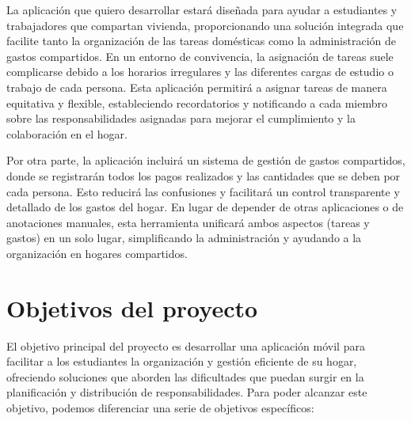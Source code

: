 La aplicación que quiero desarrollar estará diseñada para ayudar a estudiantes y trabajadores que compartan vivienda,
proporcionando una solución integrada que facilite tanto la organización de las tareas domésticas como la administración de gastos compartidos.
En un entorno de convivencia, la asignación de tareas suele complicarse debido a los horarios irregulares y las diferentes cargas de estudio o trabajo de cada persona.
Esta aplicación permitirá a asignar tareas de manera equitativa y flexible, estableciendo recordatorios y notificando a cada miembro sobre las responsabilidades
asignadas para mejorar el cumplimiento y la colaboración en el hogar. 

Por otra parte, la aplicación incluirá un sistema de gestión de gastos compartidos, donde se registrarán todos los pagos realizados
y las cantidades que se deben por cada persona. Esto reducirá las confusiones y facilitará un control transparente y detallado de los 
gastos del hogar. En lugar de depender de otras aplicaciones o de anotaciones manuales, esta herramienta unificará ambos aspectos (tareas y gastos) 
en un solo lugar, simplificando la administración y ayudando a la organización en hogares compartidos. 

\section{Objetivos del proyecto}
\label{sec:objetivos}

El objetivo principal del proyecto es desarrollar una aplicación móvil para facilitar a los estudiantes la organización y gestión eficiente de su hogar, ofreciendo soluciones que aborden las dificultades 
que puedan surgir en la planificación y distribución de responsabilidades. Para poder alcanzar este objetivo, podemos diferenciar una serie de objetivos específicos:

